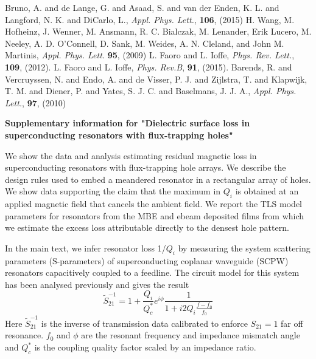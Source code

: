 \documentclass[aip,jap,reprint,nobalancelastpage]{revtex4-1}
\begin{document}
\begin{thebibliography}{99}
 Bruno, A. and de Lange, G. and Asaad, S. and van der Enden, K. L. and Langford, N. K. and DiCarlo, L., \textit{Appl. Phys. Lett.}, \textbf{106}, (2015)
 H.  Wang, M.  Hofheinz, J.  Wenner, M.  Ansmann, R. C.  Bialczak, M.  Lenander,  Erik Lucero, M.  Neeley, A. D.  O’Connell, D.  Sank, M.  Weides, A. N.  Cleland, and  John M. Martinis, \textit{Appl. Phys. Lett.} \textbf{95},  (2009)
L. Faoro and L. Ioffe, \textit{Phys. Rev. Lett.}, \textbf{109}, (2012).
L. Faoro and L. Ioffe, \textit{Phys. Rev.B}, \textbf{91}, (2015).
  Barends, R. and Vercruyssen, N. and Endo, A. and de Visser, P. J. and Zijlstra, T. and Klapwijk, T. M. and Diener, P. and Yates, S. J. C. and Baselmans, J. J. A., \textit{Appl. Phys. Lett.}, \textbf{97}, (2010)

\end{thebibliography}

\clearpage
\newcommand{\beginsupplement}{%
        \setcounter{table}{0}
        \renewcommand{\thetable}{S\arabic{table}}%
        \setcounter{figure}{0}
        \renewcommand{\thefigure}{S\arabic{figure}}%
        \setcounter{equation}{0}
        \renewcommand{\theequation}{S\arabic{equation}}%
     }
\beginsupplement
\makeatletter
\makeatother

\begin{center}
\textbf{Supplementary information for "Dielectric surface loss in superconducting resonators with flux-trapping holes"}
\end{center}

\def \Bcapp {\text{B}^{\text{cool}}_{\text{applied}}}

We show the data and analysis estimating residual magnetic loss in superconducting resonators with flux-trapping hole arrays. We describe the design rules used to embed a meandered resonator in a rectangular array of holes.  We show data supporting the claim that the maximum in $Q_{i}$ is obtained at an applied magnetic field that cancels the ambient field.  We report the TLS model parameters for resonators from the MBE and ebeam deposited films from which we estimate the excess loss attributable directly to the densest hole pattern.
\maketitle

In the main text, we infer resonator loss 1/$Q_i$ by measuring the system scattering parameters (S-parameters) of superconducting coplanar waveguide (SCPW) resonators capacitively coupled to a feedline.  The circuit model for this system has been analysed previously \cite{megrant2012} and gives the result 
\begin{equation}
\label{spectroscopyS21}
\tilde{S}_{21}^{-1} = 1 + \frac{Q_{i}}{Q_{c}^{*}}e^{i \phi}\frac{1}{1+i2 Q_{i} \frac{f-f_{0}}{f_{0}}}
\end{equation}
Here $\tilde{S}_{21}^{-1}$ is the inverse of transmission data calibrated to enforce $S_{21}=1$ far off resonance.  $f_{0}$ and $\phi$ are the resonant frequency and impedance mismatch angle and  $Q_{c}^{*}$ is the coupling quality factor scaled by an impedance ratio.
\end{document}
